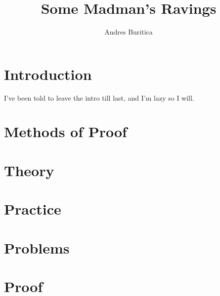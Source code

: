 \documentclass{book}
\title{Some Madman's Ravings}
\author{Andres Buritica}
\begin{document}
\maketitle
\section*{Introduction}
  I've been told to leave the intro till last, and I'm lazy so I will.
\section*{Methods of Proof}
\section*{Theory}
\section*{Practice}
\section*{Problems}
\section*{Proof}
\end{document}
